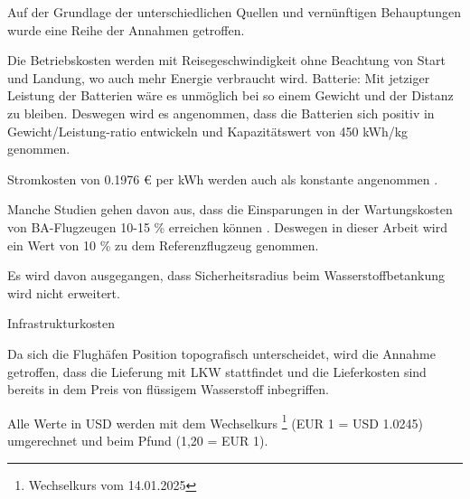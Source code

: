 
Auf der Grundlage der unterschiedlichen Quellen und vernünftigen Behauptungen wurde eine Reihe der Annahmen getroffen.

Die Betriebskosten werden mit Reisegeschwindigkeit ohne Beachtung von Start und Landung, wo auch mehr Energie verbraucht wird.
Batterie: Mit jetziger Leistung der Batterien wäre es unmöglich bei so einem Gewicht und der Distanz zu bleiben.
Deswegen wird es angenommen, dass die Batterien sich positiv in Gewicht/Leistung-ratio entwickeln und Kapazitätswert von 450 kWh/kg genommen.

Stromkosten von 0.1976 € per kWh werden auch als konstante angenommen \cite{eurostat_nrg_pc_205}.


Manche Studien gehen davon aus, dass die Einsparungen in der Wartungskosten von BA-Flugzeugen 10-15 \% erreichen können 
\cite{wangsness2021fremskyndet,avogadro2024demystifying}. Deswegen in dieser Arbeit wird ein Wert von 10 \% zu dem Referenzflugzeug genommen.

Es wird davon ausgegangen, dass Sicherheitsradius beim Wasserstoffbetankung wird nicht erweitert. 

Infrastrukturkosten

Da sich die Flughäfen Position topografisch unterscheidet, wird die Annahme getroffen, dass die Lieferung mit LKW stattfindet 
und die Lieferkosten sind bereits in dem Preis von flüssigem Wasserstoff inbegriffen.

Alle Werte in USD werden mit dem Wechselkurs \footnote{Wechselkurs vom 14.01.2025} (EUR 1 = USD 1.0245) umgerechnet und beim Pfund (1,20 = EUR 1).




